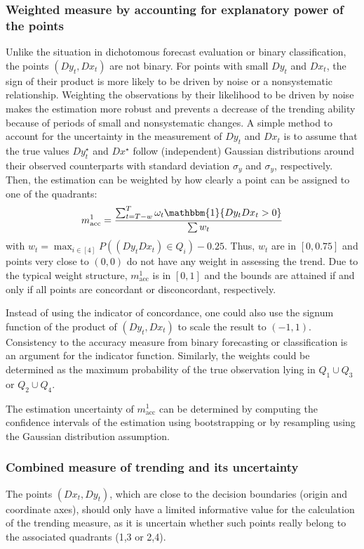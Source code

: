 \documentclass[oneside]{article}
\theoremstyle{plain}%
\theoremstyle{definition}
\newcommand{\ind}[1]{\mathbbm{1}\{#1\}}
\newcommand{\ydiff}{D y}
\newcommand{\ydifft}{Dy^\star}
\newcommand{\xdiff}{Dx}
\newcommand{\xdifft}{Dx^\star}
\begin{document}
\subsubsection{Weighted measure by accounting for explanatory power of the points}\label{subsec:w1}

Unlike the situation in dichotomous forecast evaluation or binary classification, the points $(\ydiff_t, \xdiff_t)$ are not binary.
For points with small $\ydiff_t$ and $\xdiff_t$, the sign of their product is more likely to be driven by noise or a nonsystematic relationship.
Weighting the observations by their likelihood to be driven by noise makes the estimation more robust and prevents a decrease of the trending ability because of periods of small and nonsystematic changes. 
A simple method to account for the uncertainty in the measurement of $\ydiff_t$ and $\xdiff_t$ is to assume that the true values $\ydifft_t$ and $\xdifft$ follow (independent) Gaussian distributions around their observed counterparts with standard deviation $\sigma_y$ and $\sigma_y$, respectively.
Then, the estimation can be weighted by how clearly a point can be assigned to one of the quadrants:
\begin{equation}
    m_{\text{acc}}^1 = \frac{\sum_{t=T-w}^T \omega_t \ind{\ydiff_t \xdiff_t > 0} }{\sum w_t}
\end{equation}
with $w_t = \max_{i \in [4]} P((\ydiff_t \xdiff_t) \in Q_i) - 0.25$.
Thus, $w_t$ are in $[0, 0.75]$ and points very close to $(0, 0)$ do not have any weight in assessing the trend. 
Due to the typical weight structure, $m_{\text{acc}}^1$ is in $[0,1]$ and the bounds are attained if and only if all points are concordant or disconcordant, respectively.

Instead of using the indicator of concordance, one could also use the signum function of the product of $(\ydiff_t, \xdiff_t)$ to scale the result to $(-1, 1)$.
Consistency to the accuracy measure from binary forecasting or classification is an argument for the indicator function.
Similarly, the weights could be determined as the maximum probability of the true observation lying in $Q_1 \cup Q_3$ or $Q_2 \cup Q_4$.

The estimation uncertainty of $m_{\text{acc}}^1$ can be determined by computing the confidence intervals of the estimation using bootstrapping or by resampling using the Gaussian distribution assumption.

\subsubsection{Combined measure of trending and its uncertainty} \label{subsec:w2}
The points $(Dx_t, Dy_t)$, which are close to the decision boundaries (origin and coordinate axes), should only have a limited informative value for the calculation of the trending measure, as it is uncertain whether such points really belong to the associated quadrants (1,3 or 2,4).
\end{document}
